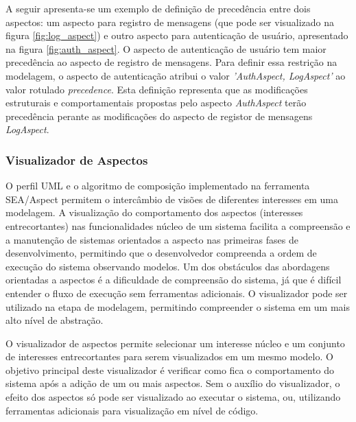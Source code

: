 A seguir apresenta-se um exemplo de definição de precedência entre dois aspectos: um aspecto para
registro de mensagens (que pode ser visualizado na figura \ref{fig:log_aspect}) e outro aspecto para autenticação de usuário, apresentado 
na figura \ref{fig:auth_aspect}. O aspecto de autenticação de usuário tem maior precedência ao aspecto de registro de mensagens. Para definir essa 
restrição na modelagem, o aspecto de autenticação atribui o valor \textit{'AuthAspect, LogAspect'} ao valor rotulado \textit{precedence}. Esta
definição representa que as modificações estruturais e comportamentais propostas pelo aspecto \textit{AuthAspect} terão precedência perante as 
modificações do aspecto de registor de mensagens \textit{LogAspect}.

\subsubsection{Visualizador de Aspectos}

O perfil UML e o algoritmo de composição implementado na ferramenta SEA/Aspect permitem o intercâmbio de visões de diferentes interesses em
uma modelagem. A visualização do comportamento dos aspectos (interesses entrecortantes) nas funcionalidades núcleo de um sistema facilita a
compreensão e a manutenção de sistemas orientados a aspecto nas primeiras fases de desenvolvimento, permitindo que o desenvolvedor compreenda a ordem de execução do
sistema observando modelos. Um dos obstáculos das abordagens orientadas a aspectos é a dificuldade de compreensão do sistema, já que é difícil
entender o fluxo de execução sem ferramentas adicionais. O visualizador pode ser utilizado na etapa de modelagem, permitindo compreender o sistema em
um mais alto nível de abstração. 

O visualizador de aspectos permite selecionar um interesse núcleo e um conjunto de interesses entrecortantes para serem visualizados em um mesmo
modelo. O objetivo principal deste visualizador é verificar como fica o comportamento do sistema após a adição de um ou mais aspectos. Sem o
auxílio do visualizador, o efeito dos aspectos só pode ser visualizado ao executar o sistema, ou, utilizando ferramentas adicionais para visualização
em nível de código.

